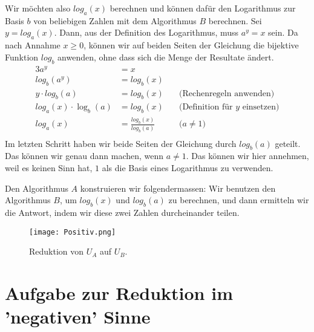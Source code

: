\documentclass[
	12pt, %
	german, %
]{fphw}
\begin{document}
Wir möchten also \(log_a(x)\) berechnen und können dafür den Logarithmus zur Basis \(b\) von beliebigen Zahlen mit dem Algorithmus \(B\) berechnen. Sei \(y = log_a(x)\). Dann, aus der Definition des Logarithmus, muss \(a^y = x\) sein. Da nach Annahme \(x \geq 0 \), können wir auf beiden Seiten der Gleichung die bijektive Funktion \(log_b\) anwenden, ohne dass sich die Menge der Resultate ändert.
\begin{alignat*}{3}
a^y &= x & \\
log_b(a^y) &= log_b(x) & \\
y \cdot log_b(a) &= log_b(x) & \quad \text{(Rechenregeln anwenden)} \\
log_a(x) \cdot \log_b(a) &= log_b(x) & \quad \text{(Definition für \(y\) einsetzen)}\\
log_a(x) &= \frac{log_b(x)}{log_b(a)} & \quad \text{(\(a \neq 1\))}\\
\end{alignat*}
Im letzten Schritt haben wir beide Seiten der Gleichung durch \(log_b(a)\) geteilt. Das können wir genau dann machen, wenn \(a \neq 1\). Das können wir hier annehmen, weil es keinen Sinn hat, \(1\) als die Basis eines Logarithmus zu verwenden.

Den Algorithmus \(A\) konstruieren wir folgendermassen: Wir benutzen den Algorithmus \(B\), um \(log_b(x)\) und \(log_b(a)\) zu berechnen, und dann ermitteln wir die Antwort, indem wir diese zwei Zahlen durcheinander teilen.

\begin{figure}[H]
	\centering
	\texttt{[image: Positiv.png]}
	\caption{Reduktion von \(U_A\) auf \(U_B\).}
\end{figure}


\section*{Aufgabe zur Reduktion im 'negativen' Sinne}
\end{document}
